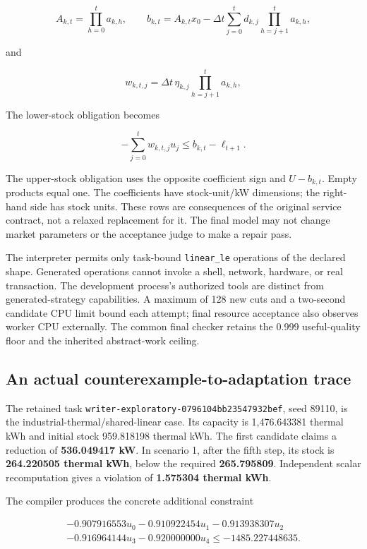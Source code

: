 \[
A_{k,t}=\prod_{h=0}^{t}a_{k,h},\qquad
b_{k,t}=A_{k,t}x_0-\Delta t\sum_{j=0}^{t}d_{k,j}\prod_{h=j+1}^{t}a_{k,h},
\]

and

\[
w_{k,t,j}=\Delta t\,\eta_{k,j}\prod_{h=j+1}^{t}a_{k,h},
\]


The lower-stock obligation becomes

\[
-\sum_{j=0}^{t}w_{k,t,j}u_j\leq b_{k,t}-\ell_{t+1}.
\]

The upper-stock obligation uses the opposite coefficient sign and
\(U-b_{k,t}\). Empty products equal one. The coefficients have
stock-unit/kW dimensions; the right-hand side has stock units. These
rows are consequences of the original service contract, not a relaxed
replacement for it. The final model may not change market parameters or
the acceptance judge to make a repair pass.

The interpreter permits only task-bound \texttt{linear\_le} operations
of the declared shape. Generated operations cannot invoke a shell,
network, hardware, or real transaction. The development process's
authorized tools are distinct from generated-strategy capabilities. A
maximum of 128 new cuts and a two-second candidate CPU limit bound each
attempt; final resource acceptance also observes worker CPU externally.
The common final checker retains the 0.999 useful-quality floor and the
inherited abstract-work ceiling.

\subsection{An actual counterexample-to-adaptation
trace}\label{an-actual-counterexample-to-adaptation-trace}

The retained task \texttt{writer-exploratory-0796104bb23547932bef}, seed
89110, is the industrial-thermal/shared-linear case. Its capacity is
1,476.643381 thermal kWh and initial stock 959.818198 thermal kWh. The
first candidate claims a reduction of \textbf{536.049417 kW}. In
scenario 1, after the fifth step, its stock is \textbf{264.220505
thermal kWh}, below the required \textbf{265.795809}. Independent scalar
recomputation gives a violation of \textbf{1.575304 thermal kWh}.

The compiler produces the concrete additional constraint

\[
\begin{aligned}
-0.907916553u_0-0.910922454u_1-0.913938307u_2\\
-0.916964144u_3-0.920000000u_4\leq-1485.227448635.
\end{aligned}
\]

